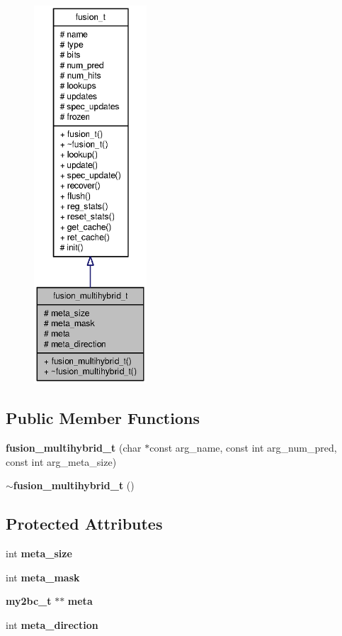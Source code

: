 \begin{figure}[H]
\begin{center}
\leavevmode
\includegraphics[height=400pt]{classfusion__multihybrid__t__coll__graph}
\end{center}
\end{figure}
\subsection*{Public Member Functions}
\begin{CompactItemize}
\item 
{\bf fusion\_\-multihybrid\_\-t} (char $\ast$const arg\_\-name, const int arg\_\-num\_\-pred, const int arg\_\-meta\_\-size)
\item 
{\bf $\sim$fusion\_\-multihybrid\_\-t} ()
\end{CompactItemize}
\subsection*{Protected Attributes}
\begin{CompactItemize}
\item 
int {\bf meta\_\-size}
\item 
int {\bf meta\_\-mask}
\item 
{\bf my2bc\_\-t} $\ast$$\ast$ {\bf meta}
\item 
int {\bf meta\_\-direction}
\end{CompactItemize}


